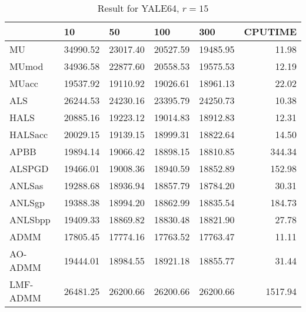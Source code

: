 \documentclass{article}
\begin{document}
\begin{table}[H]
		\caption{Result for YALE64, $r = 15$}
	\centering
	\begin{tabular}{|l|r|r|r|r|r|}
		\hline
		& \multicolumn{1}{l|}{10} & \multicolumn{1}{l|}{50} & \multicolumn{1}{l|}{100} & \multicolumn{1}{l|}{300} & \multicolumn{1}{l|}{CPUTIME} \\ \hline
		MU       & 34990.52                & 23017.40                & 20527.59                 & 19485.95                 & 11.98                        \\ \hline
		MUmod    & 34936.58                & 22877.60                & 20558.53                 & 19575.53                 & 12.19                        \\ \hline
		MUacc    & 19537.92                & 19110.92                & 19026.61                 & 18961.13                 & 22.02                        \\ \hline
		ALS      & 26244.53                & 24230.16                & 23395.79                 & 24250.73                 & 10.38                        \\ \hline
		HALS     & 20885.16                & 19223.12                & 19014.83                 & 18912.83                 & 12.31                        \\ \hline
		HALSacc  & 20029.15                & 19139.15                & 18999.31                 & 18822.64                 & 14.50                        \\ \hline
		APBB     & 19894.14                & 19066.42                & 18898.15                 & 18810.85                 & 344.34                       \\ \hline
		ALSPGD   & 19466.01                & 19008.36                & 18940.59                 & 18852.89                 & 152.98                       \\ \hline
		ANLSas   & 19288.68                & 18936.94                & 18857.79                 & 18784.20                 & 30.31                        \\ \hline
		ANLSgp   & 19388.38                & 18994.20                & 18862.99                 & 18835.54                 & 184.73                       \\ \hline
		ANLSbpp  & 19409.33                & 18869.82                & 18830.48                 & 18821.90                 & 27.78                        \\ \hline
		ADMM     & 17805.45                & 17774.16                & 17763.52                 & 17763.47                 & 11.11                        \\ \hline
		AO-ADMM  & 19444.01                & 18984.55                & 18921.18                 & 18855.77                 & 31.44                        \\ \hline
		LMF-ADMM & 26481.25                & 26200.66                & 26200.66                 & 26200.66                 & 1517.94                      \\ \hline
	\end{tabular}
\end{table}
\end{document}
